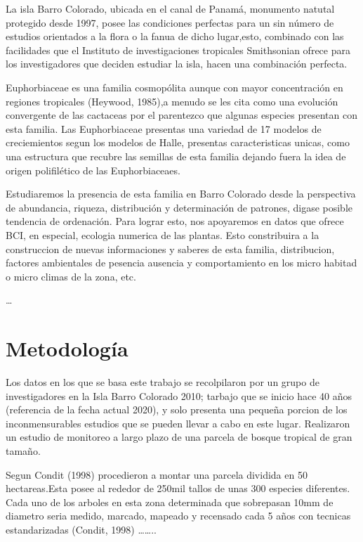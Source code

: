 \documentclass[11pt,]{article}
\begin{document}
La isla Barro Colorado, ubicada en el canal de Panamá, monumento natutal
protegido desde 1997, posee las condiciones perfectas para un sin número
de estudios orientados a la flora o la fanua de dicho lugar,esto,
combinado con las facilidades que el Instituto de investigaciones
tropicales Smithsonian ofrece para los investigadores que deciden
estudiar la isla, hacen una combinación perfecta.

Euphorbiaceae es una familia cosmopólita aunque con mayor concentración
en regiones tropicales (Heywood, 1985),a menudo se les cita como una
evolución convergente de las cactaceas por el parentezco que algunas
especies presentan con esta familia. Las Euphorbiaceae presentas una
variedad de 17 modelos de creciemientos segun los modelos de Halle,
presentas caracteristicas unicas, como una estructura que recubre las
semillas de esta familia dejando fuera la idea de origen polifilético de
las Euphorbiaceaes.

Estudiaremos la presencia de esta familia en Barro Colorado desde la
perspectiva de abundancia, riqueza, distribución y determinación de
patrones, digase posible tendencia de ordenación. Para lograr esto, nos
apoyaremos en datos que ofrece BCI, en especial, ecologia numerica de
las plantas. Esto constribuira a la construccion de nuevas informaciones
y saberes de esta familia, distribucion, factores ambientales de
pesencia ausencia y comportamiento en los micro habitad o micro climas
de la zona, etc.

\ldots

\section{Metodología}\label{metodologuxeda}

Los datos en los que se basa este trabajo se recolpilaron por un grupo
de investigadores en la Isla Barro Colorado 2010; tarbajo que se inicio
hace 40 años (referencia de la fecha actual 2020), y solo presenta una
pequeña porcion de los inconmensurables estudios que se pueden llevar a
cabo en este lugar. Realizaron un estudio de monitoreo a largo plazo de
una parcela de bosque tropical de gran tamaño.

Segun Condit (1998) procedieron a montar una parcela dividida en 50
hectareas.Esta posee al rededor de 250mil tallos de unas 300 especies
diferentes. Cada uno de los arboles en esta zona determinada que
sobrepasan 10mm de diametro seria medido, marcado, mapeado y recensado
cada 5 años con tecnicas estandarizadas (Condit, 1998)
\ldots{}\ldots{}..
\end{document}
